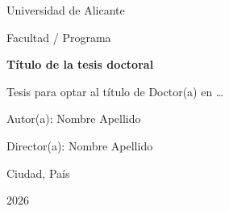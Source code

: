 \begin{titlepage}
\centering

{\Large Universidad de Alicante\par}
\vspace{0.5cm}
{\Large Facultad / Programa\par}
\vspace{2.5cm}

{\Huge\bfseries Título de la tesis doctoral\par}
\vspace{1.5cm}

{\Large Tesis para optar al título de Doctor(a) en \dots\par}
\vspace{1.2cm}

{\Large Autor(a): Nombre Apellido\par}
\vspace{0.3cm}
{\Large Director(a): Nombre Apellido\par}

\vfill
{\Large Ciudad, País\par}
{\Large 2026\par}

\end{titlepage}
\clearpage